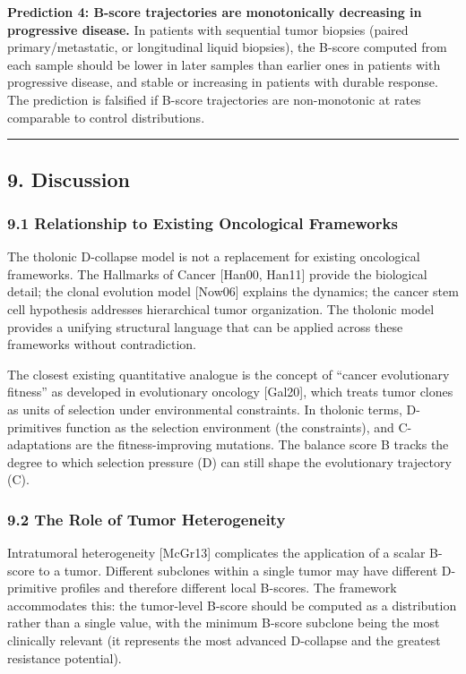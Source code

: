\documentclass[
  11pt,
  letterpaper,
]{article}
\begin{document}
\textbf{Prediction 4: B-score trajectories are monotonically decreasing
in progressive disease.} In patients with sequential tumor biopsies
(paired primary/metastatic, or longitudinal liquid biopsies), the
B-score computed from each sample should be lower in later samples than
earlier ones in patients with progressive disease, and stable or
increasing in patients with durable response. The prediction is
falsified if B-score trajectories are non-monotonic at rates comparable
to control distributions.

\begin{center}\rule{0.5\linewidth}{0.5pt}\end{center}

\subsection{9. Discussion}\label{discussion}

\subsubsection{9.1 Relationship to Existing Oncological
Frameworks}\label{relationship-to-existing-oncological-frameworks}

The tholonic D-collapse model is not a replacement for existing
oncological frameworks. The Hallmarks of Cancer {[}Han00, Han11{]}
provide the biological detail; the clonal evolution model {[}Now06{]}
explains the dynamics; the cancer stem cell hypothesis addresses
hierarchical tumor organization. The tholonic model provides a unifying
structural language that can be applied across these frameworks without
contradiction.

The closest existing quantitative analogue is the concept of ``cancer
evolutionary fitness'' as developed in evolutionary oncology
{[}Gal20{]}, which treats tumor clones as units of selection under
environmental constraints. In tholonic terms, D-primitives function as
the selection environment (the constraints), and C-adaptations are the
fitness-improving mutations. The balance score B tracks the degree to
which selection pressure (D) can still shape the evolutionary trajectory
(C).

\subsubsection{9.2 The Role of Tumor
Heterogeneity}\label{the-role-of-tumor-heterogeneity}

Intratumoral heterogeneity {[}McGr13{]} complicates the application of a
scalar B-score to a tumor. Different subclones within a single tumor may
have different D-primitive profiles and therefore different local
B-scores. The framework accommodates this: the tumor-level B-score
should be computed as a distribution rather than a single value, with
the minimum B-score subclone being the most clinically relevant (it
represents the most advanced D-collapse and the greatest resistance
potential).
\end{document}

